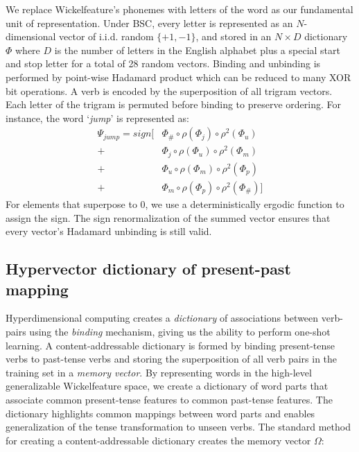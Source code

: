 \documentclass{article}
\begin{document}
We replace Wickelfeature's phonemes with letters of the word as our fundamental unit of representation. Under BSC, every letter is represented as an $N$-dimensional vector of i.i.d. random $\{+1, -1\}$, and stored in an $N \times D$ dictionary $\Phi$ where $D$ is the number of letters in the English alphabet plus a special start and stop letter for a total of 28 random vectors. Binding and unbinding is performed by point-wise Hadamard product which can be reduced to many XOR bit operations. A verb is encoded by the superposition of all trigram vectors. Each letter of the trigram is permuted before binding to preserve ordering. For instance, the word `\emph{jump}' is represented as:
\begin{align}
\label{eq:wickel}
\Psi_{jump} = sign [& \Phi_{\#} \circ \rho(\Phi_{j}) \circ \rho^2(\Phi_{u}) \\
    	+ & \Phi_j \circ \rho(\Phi_u) \circ \rho^2 (\Phi_m) \nonumber \\
        + & \Phi_u \circ \rho(\Phi_m) \circ \rho^2(\Phi_p) \nonumber \\
        + & \Phi_m \circ \rho(\Phi_p) \circ \rho^2 (\Phi_{\#}) ] \nonumber
\end{align}
For elements that superpose to 0, we use a deterministically ergodic function to assign the sign. The sign renormalization of the summed vector ensures that every vector's Hadamard unbinding is still valid. 


\subsection{Hypervector dictionary of present-past mapping}
Hyperdimensional computing creates a \emph{dictionary} of associations between verb-pairs using the \emph{binding} mechanism, giving us the ability to perform one-shot learning. A content-addressable dictionary is formed by binding present-tense verbs to past-tense verbs and storing the superposition of all verb pairs in the training set in a \emph{memory vector}. By representing words in the high-level generalizable Wickelfeature space, we create a dictionary of word parts that associate common present-tense features to common past-tense features. The dictionary highlights common mappings between word parts and enables generalization of the tense transformation to unseen verbs. The standard method for creating a content-addressable dictionary creates the memory vector $\Omega$:
\end{document}
